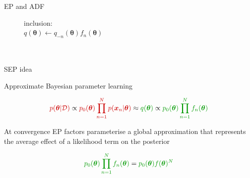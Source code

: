\documentclass[mathserif]{beamer}
\begin{document}
\begin{frame}{EP and ADF}
\begin{figure}[!t]
\begin{minipage}[t]{0.45\linewidth}
\begin{algorithm}[H]
\begin{algorithmic}[1]
	\STATE inclusion:\\ $q(\bm{\theta}) \leftarrow q_{-n}(\bm{\theta}) f_n(\bm{\theta})$\\\hspace{1mm}\\ \vspace{1.5mm} \hspace{1mm}\\
\end{algorithmic}
\end{algorithm}
\end{minipage}
%
\end{figure}


\end{frame}


\begin{frame}{SEP idea}

Approximate Bayesian parameter learning

\begin{equation}
{\color{dkred}p(\bm{\theta} | \mathcal{D})} \propto {\color{dkred}p_0(\bm{\theta}) \prod_{n=1}^{N} p(\bm{x}_n | \bm{\theta})} \approx {\color{dkgreen} q(\bm{\theta})} \propto {\color{dkgreen}p_0(\bm{\theta}) \prod_{n=1}^{N} f_n(\bm{\theta})}\nonumber
\end{equation}

At convergence EP factors parameterise a global approximation that represents the average effect of a likelihood term on the posterior

\begin{equation}
 {\color{dkgreen}p_0(\bm{\theta}) \prod_{n=1}^{N} f_n(\bm{\theta})} = {\color{dkgreen}p_0(\bm{\theta})  f(\bm{\theta})^{N}}\nonumber
\end{equation}

\end{frame}
\end{document}
